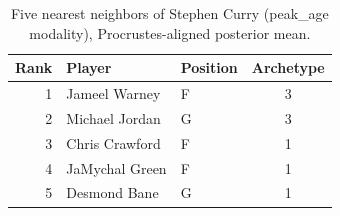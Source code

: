 \begin{table}[htbp]
  \centering\small
  \begin{tabular}{rllc}
    \toprule
    Rank & Player & Position & Archetype \\
    \midrule
    1 & Jameel Warney & F & 3 \\
    2 & Michael Jordan & G & 3 \\
    3 & Chris Crawford & F & 1 \\
    4 & JaMychal Green & F & 1 \\
    5 & Desmond Bane & G & 1 \\
    \bottomrule
  \end{tabular}
  \caption{Five nearest neighbors of Stephen Curry (peak_age modality), Procrustes-aligned posterior mean.}
  \label{tab:Stephen_Curry_neighbors_peak_age}
\end{table}

